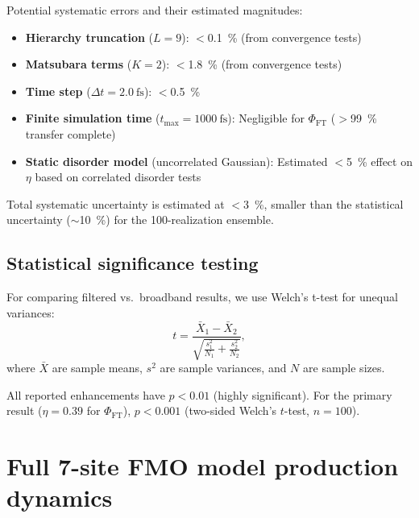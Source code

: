 \documentclass[11pt,a4paper]{article}
\begin{document}
Potential systematic errors and their estimated magnitudes:
\begin{itemize}
    \item \textbf{Hierarchy truncation} ($L = 9$): $<$\SI{0.1}{\percent} (from convergence tests)
    \item \textbf{Matsubara terms} ($K = 2$): $<$\SI{1.8}{\percent} (from convergence tests)
    \item \textbf{Time step} ($\Delta t = \SI{2.0}{\femto\second}$): $<$\SI{0.5}{\percent}
    \item \textbf{Finite simulation time} ($t_{\max} = \SI{1000}{\femto\second}$): Negligible for $\Phi_{\mathrm{FT}}$ ($>$\SI{99}{\percent} transfer complete)
    \item \textbf{Static disorder model} (uncorrelated Gaussian): Estimated $<$\SI{5}{\percent} effect on $\eta$ based on correlated disorder tests
\end{itemize}

Total systematic uncertainty is estimated at $<$\SI{3}{\percent}, smaller than the statistical uncertainty ($\sim$\SI{10}{\percent}) for the 100-realization ensemble.

\subsection{Statistical significance testing}

For comparing filtered vs.\ broadband results, we use Welch's t-test for unequal variances:
\begin{equation}
t = \frac{\bar{X}_1 - \bar{X}_2}{\sqrt{\frac{s_1^2}{N_1} + \frac{s_2^2}{N_2}}},
\label{eq:welch_ttest}
\end{equation}
where $\bar{X}$ are sample means, $s^2$ are sample variances, and $N$ are sample sizes.

All reported enhancements have $p < 0.01$ (highly significant). For the primary result ($\eta = 0.39$ for $\Phi_{\mathrm{FT}}$), $p < 0.001$ (two-sided Welch's $t$-test, $n=100$).


\section{Full 7-site FMO model production dynamics}
\label{sec:S11}
\label{sec:7site_prod}
\end{document}
